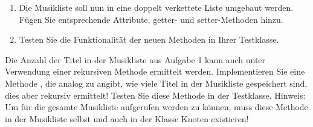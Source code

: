\documentclass{bschlangaul-aufgabe}
\begin{document}
\begin{enumerate}
%

\item Die Musikliste soll nun in eine doppelt verkettete Liste umgebaut
werden. Fügen Sie entsprechende Attribute, getter- und setter-Methoden
hinzu.

\begin{bAntwort}
\end{bAntwort}

%

\item Testen Sie die Funktionalität der neuen Methoden in Ihrer
Testklasse.

\begin{bAntwort}
\end{bAntwort}

\end{enumerate}


Die Anzahl der Titel in der Musikliste aus Aufgabe 1 kann auch unter
Verwendung einer rekursiven Methode ermittelt werden. Implementieren Sie
eine Methode , die analog zu
 angibt, wie viele Titel in der Musikliste
gespeichert sind, dies aber rekursiv ermittelt! Testen Sie diese Methode
in der Testklasse. Hinweis: Um für die gesamte Musikliste aufgerufen
werden zu können, muss diese Methode in der Musikliste selbst und auch
in der Klasse Knoten existieren!

\begin{bAntwort}


\end{bAntwort}
\end{document}
